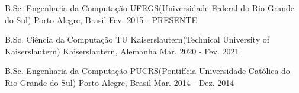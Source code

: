 
\begin{cventries}
    \cvcompactentry
    {B.Sc. Engenharia da Computação} %
    {UFRGS(Universidade Federal do Rio Grande do Sul)} %
    {Porto Alegre, Brasil} %
    {Fev. 2015 - PRESENTE} %

    \cvcompactentry
    {B.Sc. Ciência da Computação} %
    {TU Kaiserslautern(Technical University of Kaiserslautern)} %
    {Kaiserslautern, Alemanha} %
    {Mar. 2020 - Fev. 2021} %

    \cvcompactentry
    {B.Sc. Engenharia da Computação} %
    {PUCRS(Pontifícia Universidade Católica do Rio Grande do Sul)} %
    {Porto Alegre, Brasil} %
    {Mar. 2014 - Dez. 2014} %
\end{cventries}
